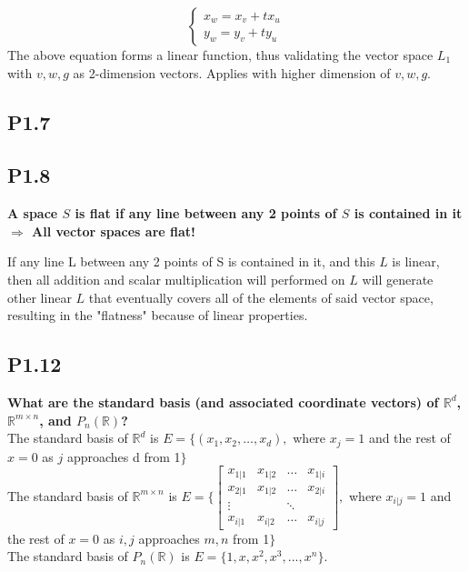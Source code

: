 \documentclass[12pt]{article}
\begin{document}
\begin{equation*}
    \begin{cases}
              x_w= x_v+tx_u\\
              y_w= y_v+ty_u
         
          \end{cases}
\end{equation*}
The above equation forms a linear function, thus validating the vector space $L_1$ with $v,w,g$ as 2-dimension vectors. Applies with higher dimension of $v,w,g$.

\subsection*{P1.7} 

\subsection*{P1.8} 
{\bfseries A space $S$ is flat if any line between any 2 points of $S$ is contained in it $\Rightarrow$ All vector spaces are flat!}

If any line L between any 2 points of S is contained in it, and this $L$ is linear, then all addition and scalar multiplication will performed on $L$ will generate other linear $L$ that eventually covers all of the elements of said vector space, resulting in the "flatness" because of linear properties.


\subsection*{P1.12}
 {\bfseries What are the standard basis (and associated coordinate vectors) of $\mathbb{R}^d$, $\mathbb{R}^{m\times n}$, and $P_n(\mathbb{R})$?}\\
The standard basis of $\mathbb{R}^d$ is $E = \{(x_1, x_2, \ldots, x_d),$ where $x_j=1$ and the rest of $x = 0$ as $j$ approaches d from 1$\}$\\
The standard basis of $\mathbb{R}^{m \times n}$ is $E = 
\{\begin{bmatrix}
x_{1|1} & x_{1|2} &\ldots & x_{1|i}\\
x_{2|1} & x_{1|2} &\ldots & x_{2|i}\\
\vdots	&		&	\ddots\\
x_{i|1} & x_{i|2} &\ldots & x_{i|j}
\end{bmatrix},$ where $x_{i|j}=1$ and the rest of $x = 0$ as $i,j$ approaches $m,n$ from 1$\}$\\
The standard basis of $P_n(\mathbb{R})$ is $ E = \{1,x,x^2,x^3,...,x^n\}$.
\end{document}
